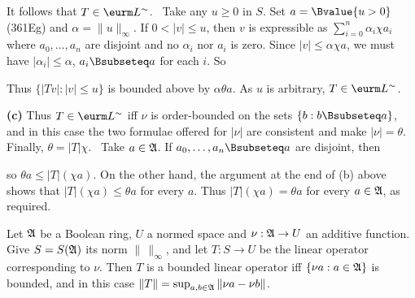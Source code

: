 {It follows that $T\in\eurm L^{\sim}$.   \Prf\ Take any $u\ge 0$ in $S$.
Set $a=\Bvalue{u>0}$ (361Eg) and $\alpha=\|u\|_{\infty}$.   If $0<|v|\le
u$, then $v$ is expressible as $\sum_{i=0}^n\alpha_i\chi a_i$ where
$a_0,\ldots,a_n$ are disjoint and no $\alpha_i$ nor $a_i$ is zero.
Since $|v|\le\alpha\chi a$, we must have $|\alpha_i|\le\alpha$,
$a_i\Bsubseteq a$ for each $i$.   So


\noindent Thus $\{|Tv|:|v|\le u\}$ is bounded above by $\alpha\theta a$.
As $u$ is arbitrary, $T\in\eurm L^{\sim}$.
\Qed\

\medskip

{\bf (c)} Thus $T\in\eurm L^{\sim}$ iff $\nu$ is order-bounded on the
sets $\{b:b\Bsubseteq a\}$, and in this case the two formulae offered
for $|\nu|$ are consistent and make $|\nu|=\theta$.    Finally,
$\theta=|T|\chi$.   \Prf\ Take $a\in\frak A$.   If
$a_0,\ldots,a_n\Bsubseteq a$ are disjoint, then


\noindent so $\theta a\le|T|(\chi a)$.   On the other hand, the argument
at the end of (b) above shows that $|T|(\chi a)\le\theta a$ for every
$a$.   Thus $|T|(\chi a)=\theta a$ for every
$a\in\frak A$, as required.\ \Qed
}%

 Let $\frak A$ be a Boolean ring, $U$ a normed
space and $\nu:\frak A\to U$
an additive function.   Give $S=S(\frak A)$ its norm $\|\,\|_{\infty}$,
and let $T:S\to U$ be the linear operator corresponding to $\nu$.   Then
$T$ is a bounded linear operator iff $\{\nu a:a\in\frak A\}$ is bounded,
and in this case $\|T\|=\sup_{a,b\in\frak A}\|\nu a-\nu b\|$.

